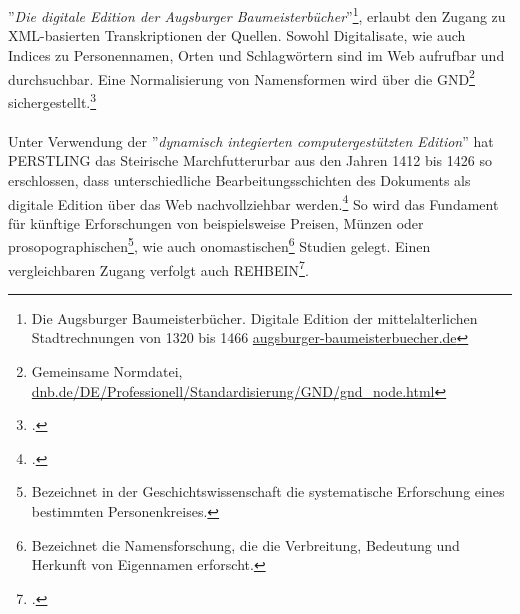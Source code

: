 \documentclass[12pt,a4paper]{article}
\begin{document}
\\
\\
''\textit{Die digitale Edition der Augsburger Baumeisterbücher}''\footnote{Die Augsburger Baumeisterbücher. Digitale Edition der mittelalterlichen Stadtrechnungen von 1320 bis 1466 \protect\url{augsburger-baumeisterbuecher.de}}, erlaubt den Zugang zu XML-basierten Transkriptionen der Quellen. Sowohl Digitalisate, wie auch Indices zu Personennamen, Orten und Schlagwörtern sind im Web aufrufbar und durchsuchbar. Eine Normalisierung von Namensformen wird über die GND\footnote{Gemeinsame Normdatei, \protect\url{dnb.de/DE/Professionell/Standardisierung/GND/gnd_node.html}} sichergestellt.\footcite[][S.109-113]{wurz2016dh}
\\
\\
Unter Verwendung der ''\textit{dynamisch integierten computergestützten Edition}'' hat PERSTLING das Steirische Marchfutterurbar aus den Jahren 1412 bis 1426 so erschlossen, dass unterschiedliche Bearbeitungsschichten des Dokuments als digitale Edition über das Web nachvollziehbar werden.\footcite{PerstlingMatthias2013MDuE} So wird das Fundament für künftige  Erforschungen von beispielsweise Preisen, Münzen oder prosopographischen\footnote{Bezeichnet in der Geschichtswissenschaft die systematische Erforschung eines bestimmten Personenkreises.}, wie  auch onomastischen\footnote{Bezeichnet die Namensforschung, die die Verbreitung, Bedeutung und Herkunft von Eigennamen erforscht.} Studien gelegt. Einen vergleichbaren Zugang verfolgt auch REHBEIN\footcite{RehbeinReconstructing2009}.
\end{document}
